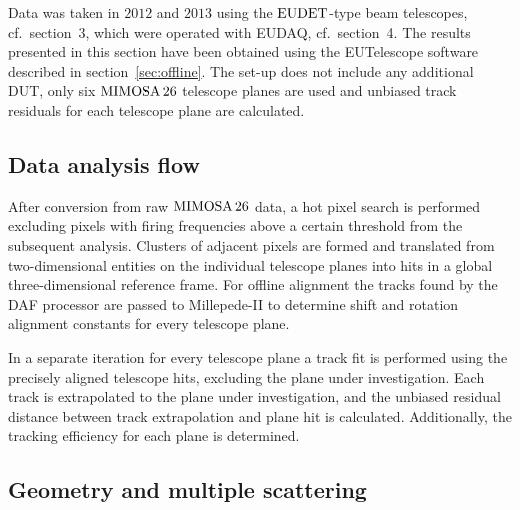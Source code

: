 Data was taken in $2012$ and $2013$ using the $\textrm{EUDET}$-type beam telescopes, cf.~section~3, which were operated with EUDAQ, cf.~section~4. 
The results presented in this section have been obtained using the EUTelescope software described in section~\ref{sec:offline}.
The set-up does not include any additional DUT, only six $\textrm{MIMOSA\,26}$ telescope planes are used and unbiased track residuals for each telescope plane are calculated.

\subsection{Data analysis flow}
\label{sec:datura-nodut}

After conversion from raw $\textrm{MIMOSA\,26}$ data, a hot pixel search is performed excluding pixels with firing frequencies above a certain threshold from the subsequent analysis.
Clusters of adjacent pixels are formed and translated from two-dimensional entities on the individual telescope planes into hits in a global three-dimensional reference frame.
For offline alignment the tracks found by the DAF processor are passed to Millepede-II to determine shift and rotation alignment constants for every telescope plane.

In a separate iteration for every telescope plane a track fit is performed using the precisely aligned telescope hits, excluding the plane under investigation.
Each track is extrapolated to the plane under investigation, and the unbiased residual distance between track extrapolation and plane hit is calculated.
Additionally, the tracking efficiency for each plane is determined. 

\subsection{Geometry and multiple scattering}
\label{sec:multiplescattering}

